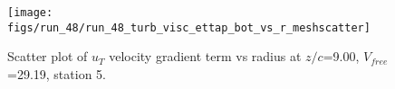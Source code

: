 \begin{figure}[H]
\centering
\texttt{[image: figs/run\_48/run\_48\_turb\_visc\_ettap\_bot\_vs\_r\_meshscatter]}
\caption{Scatter plot of $
u_T$ velocity gradient term vs radius at $z/c$=9.00, $V_{free}$=29.19, station 5.}
\end{figure}


